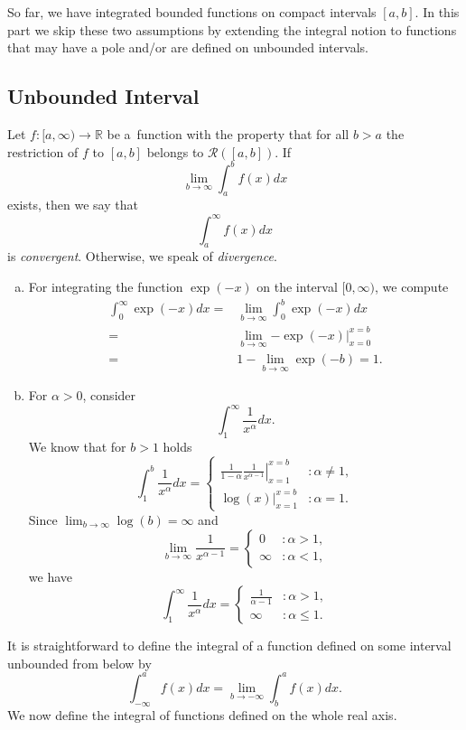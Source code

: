 

So far, we have integrated bounded functions on compact intervals $[a,b]$. In this part we skip these two assumptions by extending the integral notion to functions that may have a pole and/or are defined on unbounded intervals.
\subsection{Unbounded Interval}
\begin{Definition}
Let $f:[a,\infty)\to\mathbb{R}$ be a~function with the property that for all $b>a$ the restriction of $f$ to $[a,b]$ belongs to $\mathcal{R}([a,b])$. If
\[\lim_{b\to\infty}\int_a^bf(x)dx\]
exists, then we say that
\[\int_a^\infty f(x)dx\]
is \emph{convergent}. Otherwise, we speak of \emph{divergence}.
\end{Definition}
\begin{example}\label{ex:infint}
\begin{enumerate}[a)]
\item For integrating the function $\exp(-x)$ on the interval $[0,\infty)$, we compute
\[
\begin{aligned}
\int_0^\infty\exp(-x)dx=&\lim_{b\to\infty}\int_0^b\exp(-x)dx\\=&\lim_{b\to\infty}\left.-\exp(-x)\right|_{x=0}^{x=b}\\
=&1-\lim_{b\to\infty}\exp(-b)=1.
\end{aligned}
\]
\item For $\alpha>0$, consider
\[\int_1^\infty \frac1{x^\alpha}dx.\]
We know that for $b>1$ holds 
\[
\int_1^b\frac1{x^\alpha}dx=\begin{cases}\left.\frac1{1-\alpha}\frac1{x^{\alpha-1}}\right|_{x=1}^{x=b}&:\alpha\neq1,\\\left.\log(x)\right|_{x=1}^{x=b}&:\alpha=1.
\end{cases}\]
Since $\lim_{b\to\infty}\log(b)=\infty$ and
\[\lim_{b\to\infty}\frac1{x^{\alpha-1}}=\begin{cases}0&:\alpha>1,\\\infty&:\alpha<1,\end{cases}\]
we have
\[\int_1^\infty \frac1{x^\alpha}dx=\begin{cases}\frac1{\alpha-1}&:\alpha>1,\\\infty&:\alpha\leq1.\end{cases}\]
\end{enumerate}
\end{example}
It is straightforward to define the integral of a function defined on some interval unbounded from below by
\[\int_{-\infty}^af(x)dx=\lim_{b\to-\infty}\int_{b}^af(x)dx.\]
We now define the integral of functions defined on the whole real axis.




